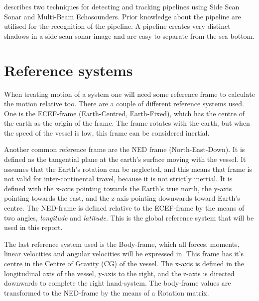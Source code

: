 	\cite{side_scan_sonar} describes two techniques for detecting and tracking pipelines using Side Scan
	Sonar and Multi-Beam Echosounders. Prior knowledge about the pipeline are utilised for the recognition
	of the pipeline. A pipeline creates very distinct shadows in a side scan sonar image and are easy to
	separate from the sea bottom.



\section{Reference systems}
	When treating motion of a system one will need some reference frame to calculate the motion 
	relative too. There are a couple of different reference systems used. One is the ECEF-frame 
	(Earth-Centred, Earth-Fixed), which has the centre of the 
	earth as the origin of the frame. The frame rotates with the earth, but when the speed of the vessel is low, 
	this frame can be considered inertial. \cite{gps_bok}
	
	Another common reference frame are the NED frame (North-East-Down). It is defined as the tangential
plane at 
	the earth's surface moving with the vessel. It assumes that the Earth's rotation can be neglected, and this means 
	that frame is not valid for inter-continental travel, because it is not strictly inertial. It is defined with 
	the x-axis pointing towards the Earth's true north, the y-axis pointing towards the east, and the z-axis 
	pointing downwards toward Earth's centre. The NED-frame is defined relative to the ECEF-frame by the
means of 
	two angles, \textit{longitude} and \textit{latitude}. This is the global reference system that will be used 
	in this report. \cite{fossen}
	
	The last reference system used is the Body-frame, which all forces, moments, linear velocities and angular 
	velocities will be expressed in. This frame has it's centre in the Centre of Gravity (CG) of the
vessel. The 
	x-axis is defined in the longitudinal axis of the vessel, y-axis to the right, and the z-axis is
directed 
	downwards to complete the right hand-system. The body-frame values are transformed to the NED-frame by the means 
	of a Rotation matrix.
	
	
	

